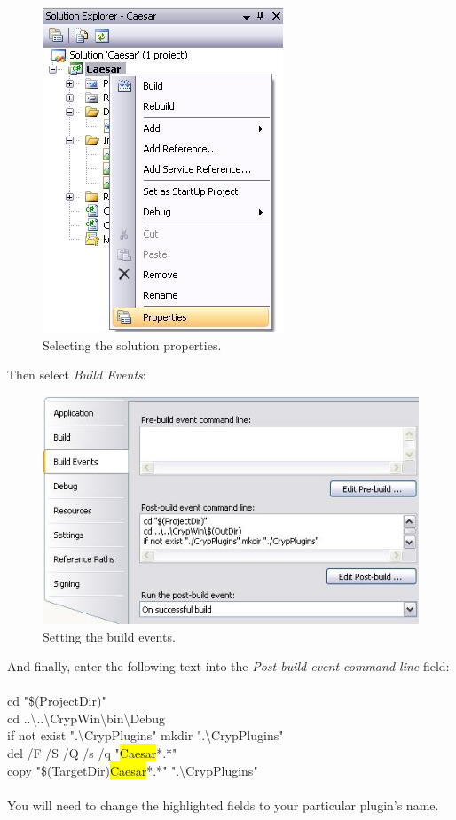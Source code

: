 \begin{figure}[h]
	\centering
		\includegraphics{figures/solution_properties.JPG}
	\caption{Selecting the solution properties.}
	\label{fig:solution_properties}
\end{figure}
\clearpage

\noindent Then select \textit{Build Events}:

\begin{figure}[h]
	\centering
		\includegraphics{figures/post_build.JPG}
	\caption{Setting the build events.}
	\label{fig:post_build}
\end{figure}

\noindent And finally, enter the following text into the \textit{Post-build event command line} field:\\\\
cd "\$(ProjectDir)" \\
cd ..\textbackslash ..\textbackslash CrypWin\textbackslash bin\textbackslash Debug\\
if not exist ".\textbackslash CrypPlugins" mkdir ".\textbackslash CrypPlugins"\\
del /F /S /Q /s /q "\colorbox{yellow}{Caesar}*.*"\\
copy "\$(TargetDir)\colorbox{yellow}{Caesar}*.*" ".\textbackslash CrypPlugins"\\\\
You will need to change the highlighted fields to your particular plugin's name.
\clearpage

